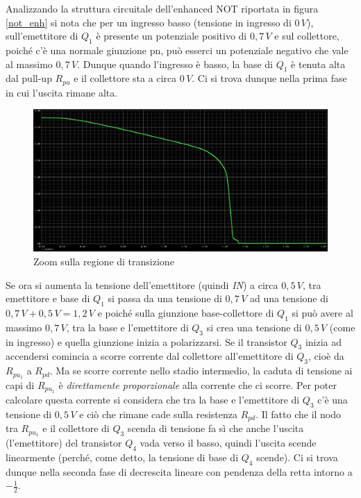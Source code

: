 \documentclass[12pt, a4paper]{report}
\begin{document}
Analizzando la struttura circuitale dell'enhanced NOT riportata in figura \ref{not_enh} si nota che per un ingresso basso (tensione in ingresso di $0\,V$), sull'emettitore di $Q_1$ è presente un potenziale positivo di $0,7\,V$ e sul collettore, poiché c'è una normale giunzione pn, può esserci un potenziale negativo che vale al massimo $0,7\,V$. Dunque quando l'ingresso è basso, la base di $Q_1$ è tenuta alta dal pull-up $R_{pu}$ e il collettore sta a circa $0\,V$. Ci si trova dunque nella prima fase in cui l'uscita rimane alta.
\begin{figure}[h]
    \centering
    \includegraphics[scale=0.35,angle=0]{ttl_not_enh_transfer_zoom.png}
    \caption{Zoom sulla regione di transizione}
    \label{enh_zoom}
\end{figure}

Se ora si aumenta la tensione dell'emettitore (quindi \textit{IN}) a circa $0,5\,V$, tra emettitore e base di $Q_1$ si passa da una tensione di $0,7\,V$ ad una tensione di $0,7\,V + 0,5\,V = 1,2\,V$ e poiché sulla giunzione base-collettore di $Q_1$ si può avere al massimo $0,7\,V$, tra la base e l'emettitore di $Q_3$ si crea una tensione di $0,5\,V$ (come in ingresso) e quella giunzione inizia a polarizzarsi. Se il transistor $Q_3$ inizia ad accendersi comincia a scorre corrente dal collettore all'emettitore di $Q_3$, cioè da $R_{pu_1}$ a $R_{pd}$. Ma se scorre corrente nello stadio intermedio, la caduta di tensione ai capi di $R_{pu_1}$ è \textit{direttamente proporzionale} alla corrente che ci scorre. Per poter calcolare questa corrente si considera che tra la base e l'emettitore di $Q_3$ c'è una tensione di $0,5\,V$ e ciò che rimane cade sulla resistenza $R_{pd}$. Il fatto che il nodo tra $R_{pu_1}$ e il collettore di $Q_3$ scenda di tensione fa sì che anche l'uscita (l'emettitore) del transistor $Q_4$ vada verso il basso, quindi l'uscita scende linearmente (perché, come detto, la tensione di base di $Q_4$ scende). Ci si trova dunque nella seconda fase di decrescita lineare con pendenza della retta intorno a $-\frac{1}{2}$.
\end{document}
